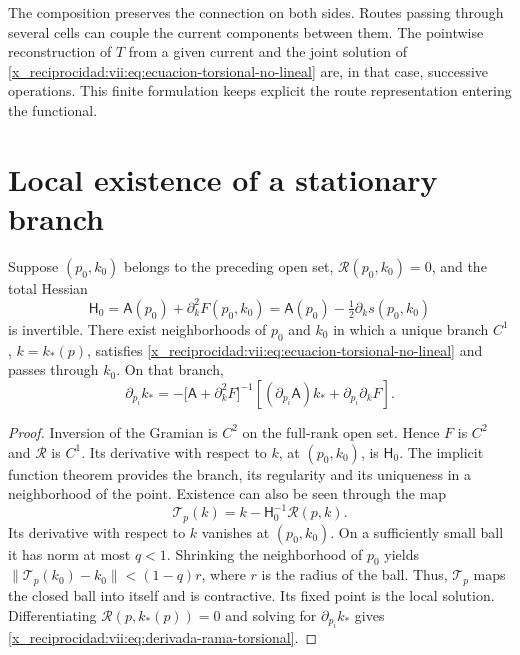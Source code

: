 The composition preserves the connection on both sides. Routes
passing through several cells can couple the current
components between them. The pointwise reconstruction of \(T\) from
a given current and the joint solution of
\eqref{x_reciprocidad:vii:eq:ecuacion-torsional-no-lineal} are, in that case,
successive operations. This finite formulation keeps explicit
the route representation entering the functional.

\section{Local existence of a stationary branch}
\label{x_reciprocidad:vii:subsec:rama-torsional-local}

\begin{theorem}
\label{x_reciprocidad:vii:thm:rama-torsional-local}
Suppose \((p_0,k_0)\) belongs to the preceding open set,
\(\mathcal R(p_0,k_0)=0\), and the total Hessian
\begin{equation}
 \mathsf H_0
 =\mathsf A(p_0)+\partial_k^2F(p_0,k_0)
 =\mathsf A(p_0)-\tfrac12\partial_ks(p_0,k_0)
 \label{x_reciprocidad:vii:eq:hessiano-total-torsional}
\end{equation}
is invertible. There exist neighborhoods of \(p_0\) and \(k_0\) in which
a unique branch \(C^1\), \(k=k_*(p)\), satisfies
\eqref{x_reciprocidad:vii:eq:ecuacion-torsional-no-lineal} and passes through \(k_0\).
On that branch,
\begin{equation}
 \partial_{p_i}k_*
 =-\bigl[\mathsf A+\partial_k^2F\bigr]^{-1}
     \left[(\partial_{p_i}\mathsf A)k_*
                      +\partial_{p_i}\partial_kF\right].
 \label{x_reciprocidad:vii:eq:derivada-rama-torsional}
\end{equation}
\end{theorem}

\begin{proof}
Inversion of the Gramian is \(C^2\) on the full-rank open
set. Hence \(F\) is \(C^2\) and \(\mathcal R\) is
\(C^1\). Its derivative with respect to \(k\), at \((p_0,k_0)\), is
\(\mathsf H_0\). The implicit function theorem provides
the branch, its regularity and its uniqueness in a neighborhood of the point.
Existence can also be seen through the map
\[
 \mathcal T_p(k)=k-\mathsf H_0^{-1}\mathcal R(p,k).
\]
Its derivative with respect to \(k\) vanishes at \((p_0,k_0)\).
On a sufficiently small ball it has norm at most
\(q<1\). Shrinking the neighborhood of \(p_0\) yields
\(\|\mathcal T_p(k_0)-k_0\|<(1-q)r\), where \(r\) is the
radius of the ball. Thus, \(\mathcal T_p\) maps the closed ball
into itself and is contractive. Its fixed point is the local solution.
Differentiating \(\mathcal R(p,k_*(p))=0\) and solving for
\(\partial_{p_i}k_*\) gives
\eqref{x_reciprocidad:vii:eq:derivada-rama-torsional}.
\end{proof}

